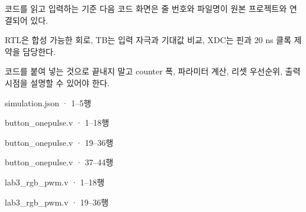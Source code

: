 \begin{frame}[label=code]{코드를 읽고 입력하는 기준}
\small
다음 코드 화면은 줄 번호와 파일명이 원본 프로젝트와 연결되어 있다.\par\vspace{0.25cm}
RTL은 합성 가능한 회로, TB는 입력 자극과 기대값 비교, XDC는 핀과 20 ns 클록 제약을 담당한다.\par\vspace{0.25cm}
코드를 붙여 넣는 것으로 끝내지 말고 counter 폭, 파라미터 계산, 리셋 우선순위, 출력 시점을 설명할 수 있어야 한다.
\end{frame}

\begin{frame}[fragile]{simulation.json · 1–5행}

\end{frame}

\begin{frame}[fragile]{button\_onepulse.v · 1–18행}

\end{frame}

\begin{frame}[fragile]{button\_onepulse.v · 19–36행}

\end{frame}

\begin{frame}[fragile]{button\_onepulse.v · 37–44행}

\end{frame}

\begin{frame}[fragile]{lab3\_rgb\_pwm.v · 1–18행}

\end{frame}

\begin{frame}[fragile]{lab3\_rgb\_pwm.v · 19–36행}

\end{frame}

